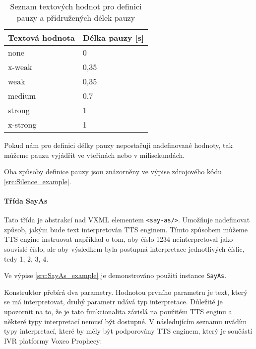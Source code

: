 \documentclass[ing,male,java,dept460]{diploma}						%
\begin{document}
\begin{table}
	\centering
	\begin{tabular}{|l|l|}
		\hline
		Textová hodnota & Délka pauzy [s] \\
		\hline
		none & 0 \\
		\hline
		x-weak & 0,35 \\
		\hline
		weak & 0,35 \\
		\hline
		medium & 0,7 \\
		\hline
		strong & 1 \\
		\hline
		x-strong & 1 \\
		\hline
	\end{tabular}
	\caption{Seznam textových hodnot pro definici pauzy a přidružených délek pauzy}
	\label{tab:Silence_pauses}
\end{table}

Pokud nám pro definici délky pauzy nepostačuji nadefinované hodnoty, tak můžeme pauzu vyjádřit ve vteřinách nebo v milisekundách.

Oba způsoby definice pauzy jsou znázorněny ve výpise zdrojového kódu \ref{src:Silence_example}.



\paragraph{Třída SayAs}
\label{sec:SayAs}
Tato třída je abstrakcí nad VXML elementem \texttt{<say-as/>}. Umožňuje nadefinovat způsob, jakým bude text interpretován TTS enginem. Tímto způsobem můžeme TTS engine instruovat například o tom, aby číslo 1234 neinterpretoval jako souvislé číslo, ale aby výsledkem byla postupná interpretace jednotlivých číslic, tedy 1, 2, 3, 4.

Ve výpise \ref{src:SayAs_example} je demonstrováno použití instance \texttt{SayAs}.



Konstruktor přebírá dva parametry. Hodnotou prvního parametru je text, který se má interpretovat, druhý parametr udává typ interpretace. Důležité je upozornit na to, že je tato funkcionalita závislá na použitém TTS enginu a některé typy interpretací nemusí být dostupné. V následujícím seznamu uvádím typy interpretací, které by měly být podporovány TTS enginem, který je součástí IVR platformy Voxeo Prophecy\cite{vxml_org}:
\end{document}
